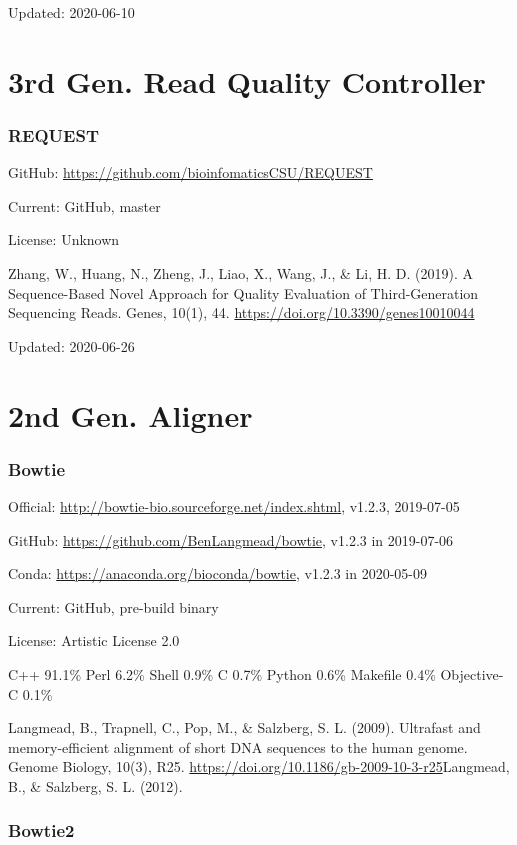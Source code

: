 \documentclass[]{article}
\begin{document}
Updated: 2020-06-10

\part{3rd Gen. Read Quality Controller}

\section{REQUEST}

GitHub: \url{https://github.com/bioinfomaticsCSU/REQUEST}

Current: GitHub, master

License: Unknown

Zhang, W., Huang, N., Zheng, J., Liao, X., Wang, J., \& Li, H. D. (2019). A Sequence-Based Novel Approach for Quality Evaluation of Third-Generation Sequencing Reads. Genes, 10(1), 44. \url{https://doi.org/10.3390/genes10010044}

Updated: 2020-06-26

\part{2nd Gen. Aligner}
\section{Bowtie}

Official: \url{http://bowtie-bio.sourceforge.net/index.shtml}, v1.2.3, 2019-07-05

GitHub: \url{https://github.com/BenLangmead/bowtie}, v1.2.3 in 2019-07-06

Conda: \url{https://anaconda.org/bioconda/bowtie}, v1.2.3 in 2020-05-09

Current: GitHub, pre-build binary

License: Artistic License 2.0

C++ 91.1\% Perl 6.2\% Shell 0.9\% C 0.7\% Python 0.6\% Makefile 0.4\% Objective-C 0.1\%

Langmead, B., Trapnell, C., Pop, M., \& Salzberg, S. L. (2009). Ultrafast and memory-efficient alignment of short DNA sequences to the human genome. Genome Biology, 10(3), R25. \url{https://doi.org/10.1186/gb-2009-10-3-r25}Langmead, B., \& Salzberg, S. L. (2012).

\section{Bowtie2}
\end{document}
